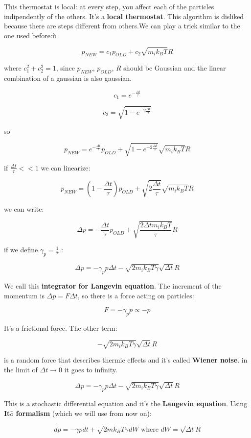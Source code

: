 \documentclass[a4paper, italian, openany]{book}
\begin{document}
This thermostat is local: at every step, you affect each of the particles indipendently of the others. It's a \textbf{local thermostat}.
This algorithm is disliked because there are steps different from others.We can play a trick similar to the one used before:ù

$$p_{NEW} = c_1 p_{OLD} + c_2 \sqrt{m_i k_B T} R$$

where $c_1^2+c_2^2 = 1$, since $p_{NEW}$, $p_{OLD}$, $R$ should be Gaussian and the linear combination of a gaussian is also gaussian.

$$c_1 = e^{-\frac{\Delta t}{\tau}}$$

$$c_2 = \sqrt{1- e^{-2\frac{\Delta t}{\tau}}}$$

so

$$p_{NEW} = e^{-\frac{\Delta t}{\tau}} p_{OLD} + \sqrt{1- e^{-2\frac{\Delta t}{\tau}}} \sqrt{m_i k_B T} R$$

if $\frac{\Delta t}{\tau} << 1$ we can linearize:

$$p_{NEW} = (1 - \frac{\Delta t}{\tau}) p_{OLD} + \sqrt{2\frac{\Delta t}{\tau}} \sqrt{m_i k_B T} R$$

we can write:

$$\Delta p = -\frac{\Delta t}{\tau} p_{OLD} + \sqrt{\frac{2\Delta t m_i k_B T}{\tau}} R$$

if we define $\gamma_p = \frac{1}{\tau}$ :

$$\Delta p = -\gamma_p p \Delta t - \sqrt{2 m_i k_B T \gamma} \sqrt{\Delta t} R$$

We call this \textbf{integrator for Langevin equation}. The increment of the momentum is $\Delta p = F \Delta t$, so there is a force acting on particles: 

$$F = -\gamma_p p \propto -p$$ 

It's a frictional force. The other term:

$$- \sqrt{2 m_i k_B T \gamma} \sqrt{\Delta t} R$$ 

is a random force that describes thermic effects and it's called \textbf{Wiener noise}. in the limit of $\Delta t \to 0$ it goes to infinity.

$$\Delta p = -\gamma_p p \Delta t - \sqrt{2 m_i k_B T \gamma} \sqrt{\Delta t} R$$

This is a stochastic differential equation and it's the \textbf{Langevin equation}. Using \textbf{It$\hat{o}$ formalism} (which we will use from now on):

$$dp = -\gamma p dt + \sqrt{2 m k_B T \gamma} dW \mbox{ where } dW =  \sqrt{\Delta t} R$$
\end{document}

